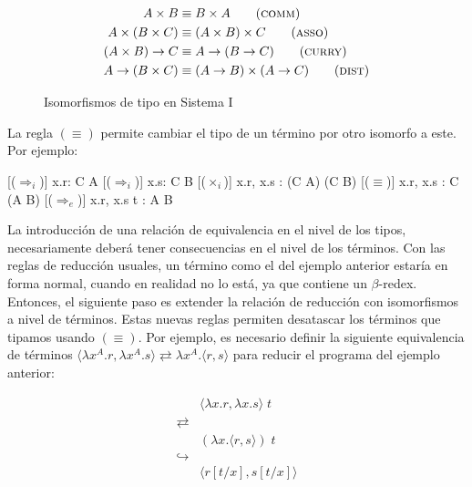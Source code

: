 \begin{figure}[H]
	\begin{align*}
		A \times B &\equiv B \times A \tag{\textsc{comm}} \\
		A \times (B \times C) &\equiv (A \times B) \times C \tag{\textsc{asso}} \\
		(A \times B) \rightarrow C &\equiv A \rightarrow (B \rightarrow C) \tag{\textsc{curry}} \\
		A \rightarrow (B \times C) &\equiv (A \rightarrow B) \times (A \rightarrow C) \tag{\textsc{dist}}
	\end{align*}
	
	\caption{Isomorfismos de tipo en Sistema I}
\end{figure}

La regla $(\equiv)$ permite cambiar el tipo de un término por otro isomorfo a este. Por ejemplo:

\begin{prooftree*}
	[($\Rightarrow_i$)]{ \Gamma\vdash \lambda x.r: C \rightarrow A }
	[($\Rightarrow_i$)]{ \Gamma\vdash \lambda x.s: C \rightarrow B }
	[($\times_i$)]{ \Gamma\vdash \langle \lambda x.r, \lambda x.s \rangle : (C \rightarrow A) \times (C \rightarrow B) }
	[($\equiv$)]{ \Gamma\vdash \langle \lambda x.r, \lambda x.s \rangle : C \rightarrow (A \times B) }
	[($\Rightarrow_e$)]{ \Gamma\vdash \langle \lambda x.r, \lambda x.s \rangle \; t : A \times B }
\end{prooftree*}

La introducción de una relación de equivalencia en el nivel de los tipos, necesariamente deberá tener consecuencias en el nivel de los términos.
Con las reglas de reducción usuales, un término como el del ejemplo anterior estaría en forma normal,  cuando en realidad no lo está, ya que contiene un $\beta$-redex.
Entonces, el siguiente paso es extender la relación de reducción con isomorfismos a nivel de términos.
Estas nuevas reglas permiten desatascar los términos que tipamos usando $(\equiv)$.
Por ejemplo, es necesario definir la siguiente equivalencia de términos $\langle \lambda x^A.r, \lambda x^A.s \rangle \rightleftarrows \lambda x^A. \langle r, s \rangle$ para reducir el programa del ejemplo anterior:

\begin{align*}
	& \langle \lambda x.r, \lambda x.s \rangle \; t \\
	\rightleftarrows& \\
	& (\lambda x. \langle r, s \rangle)\; t \\
	\hookrightarrow& \\
	& \langle r[t/x], s[t/x] \rangle
\end{align*}

